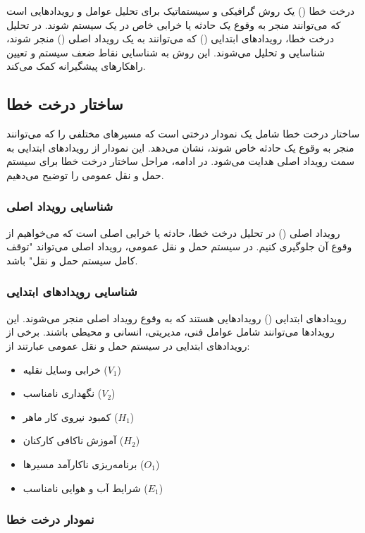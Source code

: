 درخت خطا () یک روش گرافیکی و سیستماتیک برای تحلیل عوامل و رویدادهایی است که می‌توانند منجر به وقوع یک حادثه یا خرابی خاص در یک سیستم شوند. در تحلیل درخت خطا، رویدادهای ابتدایی () که می‌توانند به یک رویداد اصلی () منجر شوند، شناسایی و تحلیل می‌شوند. این روش به شناسایی نقاط ضعف سیستم و تعیین راهکارهای پیشگیرانه کمک می‌کند.

\subsection{ساختار درخت خطا}

ساختار درخت خطا شامل یک نمودار درختی است که مسیرهای مختلفی را که می‌توانند منجر به وقوع یک حادثه خاص شوند، نشان می‌دهد. این نمودار از رویدادهای ابتدایی به سمت رویداد اصلی هدایت می‌شود. در ادامه، مراحل ساختار درخت خطا برای سیستم حمل و نقل عمومی را توضیح می‌دهیم.

\subsubsection{شناسایی رویداد اصلی}

رویداد اصلی () در تحلیل درخت خطا، حادثه یا خرابی اصلی است که می‌خواهیم از وقوع آن جلوگیری کنیم. در سیستم حمل و نقل عمومی، رویداد اصلی می‌تواند "توقف کامل سیستم حمل و نقل" باشد.

\subsubsection{شناسایی رویدادهای ابتدایی}

رویدادهای ابتدایی () رویدادهایی هستند که به وقوع رویداد اصلی منجر می‌شوند. این رویدادها می‌توانند شامل عوامل فنی، مدیریتی، انسانی و محیطی باشند. برخی از رویدادهای ابتدایی در سیستم حمل و نقل عمومی عبارتند از:

\begin{itemize}
	\item خرابی وسایل نقلیه ($ V_1 $)
	\item نگهداری نامناسب ($ V_2 $)
	\item کمبود نیروی کار ماهر ($ H_1 $)
	\item آموزش ناکافی کارکنان ($ H_2 $)
	\item برنامه‌ریزی ناکارآمد مسیرها ($ O_1 $)
	\item شرایط آب و هوایی نامناسب ($ E_1 $)
\end{itemize}

\subsubsection{نمودار درخت خطا}

